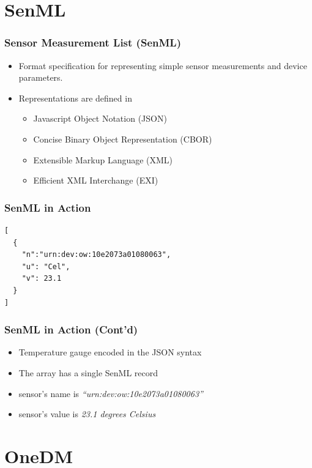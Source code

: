 \documentclass{../iot-lecture}
\begin{document}
\section{SenML}

\begin{frame}
  \frametitle{Sensor Measurement List (SenML)}
  \begin{itemize}
    \item Format specification for representing simple sensor measurements and device parameters.
    \item Representations are defined in
    \begin{itemize}
      \item Javascript Object Notation (JSON)
      \item Concise Binary Object Representation (CBOR)
      \item Extensible Markup Language (XML)
      \item Efficient XML Interchange (EXI)
    \end{itemize}
  \end{itemize}
\end{frame}

\begin{frame}[fragile]
  \frametitle{SenML in Action}
  \begin{verbatim}
[
  {
    "n":"urn:dev:ow:10e2073a01080063",
    "u": "Cel",
    "v": 23.1
  }
]
  \end{verbatim}
\end{frame}

\begin{frame}
  \frametitle{SenML in Action (Cont'd)}
  \begin{itemize}
    \item Temperature gauge encoded in the JSON syntax
    \item The array has a single SenML record
    \item sensor's name is \textit{``urn:dev:ow:10e2073a01080063''}
    \item sensor's value is \textit{23.1 degrees Celsius}
  \end{itemize}
\end{frame}

\section{OneDM}

\end{document}
